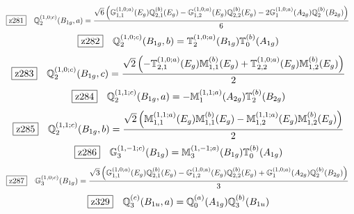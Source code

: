 \documentclass[fleqn,10pt,landscape]{jsarticle}
\begin{document}
\begin{dmath*}
\hspace*{3mm}\fbox{z281}\quad \mathbb{Q}_{2}^{(1,0;c)}(B_{1g},a)=\frac{\sqrt{6} \left(\mathbb{G}_{1,1}^{(1,0;a)}(E_{g}) \mathbb{Q}_{2,1}^{(b)}(E_{g}) - \mathbb{G}_{1,2}^{(1,0;a)}(E_{g}) \mathbb{Q}_{2,2}^{(b)}(E_{g}) - 2 \mathbb{G}_{1}^{(1,0;a)}(A_{2g}) \mathbb{Q}_{2}^{(b)}(B_{2g})\right)}{6}
\end{dmath*}
\begin{dmath*}
\hspace*{3mm}\fbox{z282}\quad \mathbb{Q}_{2}^{(1,0;c)}(B_{1g},b)=\mathbb{T}_{2}^{(1,0;a)}(B_{1g}) \mathbb{T}_{0}^{(b)}(A_{1g})
\end{dmath*}
\begin{dmath*}
\hspace*{3mm}\fbox{z283}\quad \mathbb{Q}_{2}^{(1,0;c)}(B_{1g},c)=\frac{\sqrt{2} \left(- \mathbb{T}_{2,1}^{(1,0;a)}(E_{g}) \mathbb{M}_{1,1}^{(b)}(E_{g}) + \mathbb{T}_{2,2}^{(1,0;a)}(E_{g}) \mathbb{M}_{1,2}^{(b)}(E_{g})\right)}{2}
\end{dmath*}
\begin{dmath*}
\hspace*{3mm}\fbox{z284}\quad \mathbb{Q}_{2}^{(1,1;c)}(B_{1g},a)=- \mathbb{M}_{1}^{(1,1;a)}(A_{2g}) \mathbb{T}_{2}^{(b)}(B_{2g})
\end{dmath*}
\begin{dmath*}
\hspace*{3mm}\fbox{z285}\quad \mathbb{Q}_{2}^{(1,1;c)}(B_{1g},b)=\frac{\sqrt{2} \left(\mathbb{M}_{1,1}^{(1,1;a)}(E_{g}) \mathbb{M}_{1,1}^{(b)}(E_{g}) - \mathbb{M}_{1,2}^{(1,1;a)}(E_{g}) \mathbb{M}_{1,2}^{(b)}(E_{g})\right)}{2}
\end{dmath*}
\begin{dmath*}
\hspace*{3mm}\fbox{z286}\quad \mathbb{G}_{3}^{(1,-1;c)}(B_{1g})=\mathbb{M}_{3}^{(1,-1;a)}(B_{1g}) \mathbb{T}_{0}^{(b)}(A_{1g})
\end{dmath*}
\begin{dmath*}
\hspace*{3mm}\fbox{z287}\quad \mathbb{G}_{3}^{(1,0;c)}(B_{1g})=\frac{\sqrt{3} \left(\mathbb{G}_{1,1}^{(1,0;a)}(E_{g}) \mathbb{Q}_{2,1}^{(b)}(E_{g}) - \mathbb{G}_{1,2}^{(1,0;a)}(E_{g}) \mathbb{Q}_{2,2}^{(b)}(E_{g}) + \mathbb{G}_{1}^{(1,0;a)}(A_{2g}) \mathbb{Q}_{2}^{(b)}(B_{2g})\right)}{3}
\end{dmath*}
\begin{dmath*}
\hspace*{3mm}\fbox{z329}\quad \mathbb{Q}_{3}^{(c)}(B_{1u},a)=\mathbb{Q}_{0}^{(a)}(A_{1g}) \mathbb{Q}_{3}^{(b)}(B_{1u})
\end{dmath*}
\end{document}
